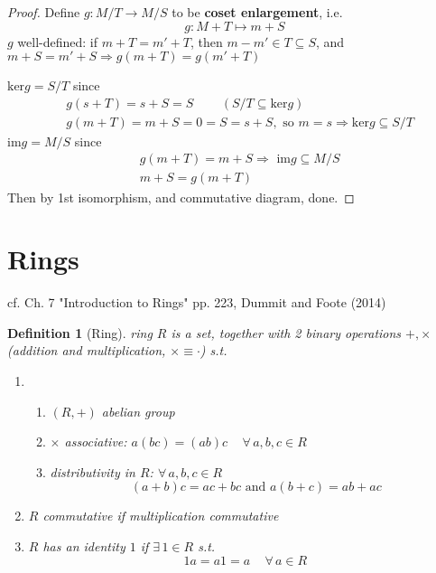 \documentclass[10pt]{amsart}
\newtheorem{definition}{Definition}
\begin{document}
\begin{multicols*}{2}
\begin{proof}
	Define $g:M/T \to M/S$ to be \textbf{coset enlargement}, i.e. 
\begin{equation}
	g:M +T \mapsto m+S
\end{equation}
$g$ well-defined: if $m+T = m'+T$, then $m-m' \in T\subseteq S$, and $m+S = m'+S \Longrightarrow g(m+T) = g(m'+T)$

$\text{ker}g = S/T$ since 
\[
\begin{aligned}
	& g(s+T) = s+S = S  \qquad \, (S/T \subseteq \text{ker}g)   \\
	& g(m+T) = m + S = 0 = S = s + S, \text{ so } m=s \Longrightarrow \text{ker}g \subseteq S/T
\end{aligned}
\]
$\text{im}g = M/S $ since 
\[
\begin{aligned}
	& g(m+T) = m+S \Longrightarrow \text{ im}g \subseteq M/S \\ 
 	& m+S = g(m+T)
\end{aligned}
\]
Then by 1st isomorphism, and commutative diagram, done.  
\end{proof} %

\section{Rings} 

cf. Ch. 7 "Introduction to Rings" pp. 223, Dummit and Foote (2014)\cite{DuFo2003}

\begin{definition}[Ring]
ring $R$ is a set, together with 2 binary operations $+, \times $ (addition and multiplication, $\times \equiv \cdot $) s.t. 
\begin{enumerate} 
\item \begin{enumerate}
	\item $(R, +)$ abelian group 
	\item $\times $ associative: $a(bc) = (ab)c \quad \, \forall \, a, b, c \in R$  
	\item distributivity in $R$: $\forall \, a , b, c \in R$ 
	\[
	(a+b)c = ac + bc \text{ and } a(b+c) = ab + ac
	\]
\end{enumerate}	
\item $R$ \emph{commutative} if multiplication commutative
\item $R$ has an identity $1$ if $\exists \, 1 \in R$ s.t.
\[
1a = a1 = a \quad \, \forall \, a \in R
\]
\end{enumerate}
\end{definition}


\end{multicols*}
\end{document}
